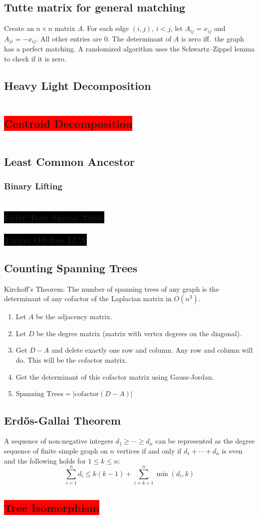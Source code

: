 \documentclass[8pt,a4paper,landscape,oneside]{amsart}
\newcommand{\code}[1]{\inputminted[fontsize=\normalsize,baselinestretch=1]{cpp}{_code/#1}}
\newcommand{\subsectionRed}[1]{\subsection{\colorbox{red}{\color{white}#1}}}
\newcommand{\subsubsectionBlack}[1]{\subsubsection{\colorbox{black}{\color{white}#1}}}
\begin{document}
\begin{multicols*}{3}
  \subsection{Tutte matrix for general matching}
    Create an $n\times n$ matrix $A$. For each edge $(i,j)$, $i<j$, let
    $A_{ij} = x_{ij}$ and $A_{ji} = -x_{ij}$. All other entries are $0$.
    The determinant of $A$ is zero iff.\ the graph has a perfect matching.
    A randomized algorithm uses the Schwartz--Zippel lemma to check if it is
    zero.
  \subsection{Heavy Light Decomposition}
    \code{graphs/heavy_light_decomposition.cpp}
	\subsectionRed{Centroid Decomposition}
    \code{graphs/centroid_decomposition.cpp}
	\subsection{Least Common Ancestor}
		\subsubsection{Binary Lifting}
      \code{graphs/lca/binary_lifting.cpp}
    \subsubsectionBlack{Euler Tour Sparse Table}
    \subsubsectionBlack{Tarjan Off-line LCA}
  \subsection{Counting Spanning Trees}
    Kirchoff's Theorem: The number of spanning trees of any graph is the
    determinant of any cofactor of the Laplacian matrix in $O(n^3)$.
    \begin{enumerate}
        \item Let $A$ be the adjacency matrix.
        \item Let $D$ be the degree matrix (matrix with vertex degrees on the diagonal).
        \item Get $D-A$ and delete exactly one row and column. Any row and
        column will do. This will be the cofactor matrix.
        \item Get the determinant of this cofactor matrix using Gauss-Jordan.
        \item $\text{Spanning Trees} = \left|\mathrm{cofactor}(D-A) \right|$
    \end{enumerate}
  \subsection{Erd\H{o}s-Gallai Theorem}
    A sequence of non-negative integers $d_1 \ge \cdots \ge d_n$ can be represented as the
    degree sequence of finite simple graph on $n$ vertices if and only if $d_1 + \cdots + d_n$ is
    even and the following holds for $1 \le k \le n$:
    \[
    \sum_{i=1}^n d_i \le k(k-1) + \sum_{i=k+1}^n \min\left(d_i, k\right)
    \]
  \subsectionRed{Tree Isomorphism}
    \code{graphs/tree_isomorphism.cpp}

\end{multicols*}
\end{document}
